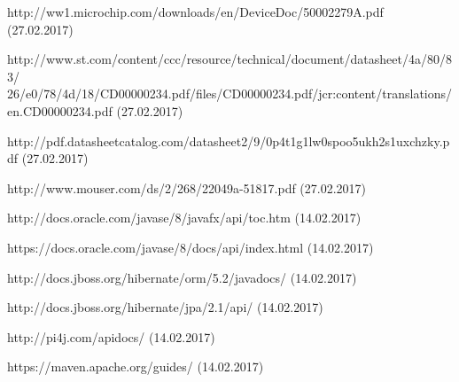 \documentclass[12pt]{article} %
\numberwithin{equation}{subsection}
\numberwithin{figure}{section}
\numberwithin{table}{section}
\begin{document}
\begin{thebibliography}{99}
		http://ww1.microchip.com/downloads/en/DeviceDoc/50002279A.pdf (27.02.2017)
		
		http://www.st.com/content/ccc/resource/technical/document/datasheet/4a/80/83/
		26/e0/78/4d/18/CD00000234.pdf/files/CD00000234.pdf/jcr:content/translations/
		en.CD00000234.pdf (27.02.2017)
		
		http://pdf.datasheetcatalog.com/datasheet2/9/0p4t1g1lw0spoo5ukh2s1uxchzky.pdf (27.02.2017)
		
		http://www.mouser.com/ds/2/268/22049a-51817.pdf (27.02.2017)
		
		http://docs.oracle.com/javase/8/javafx/api/toc.htm (14.02.2017)
		
		https://docs.oracle.com/javase/8/docs/api/index.html (14.02.2017)
		
		http://docs.jboss.org/hibernate/orm/5.2/javadocs/ (14.02.2017)
		
		http://docs.jboss.org/hibernate/jpa/2.1/api/ (14.02.2017)
		
		http://pi4j.com/apidocs/ (14.02.2017)
		
		https://maven.apache.org/guides/ (14.02.2017)
		

\end{thebibliography}
	\newpage

	\listoffigures{}
	\newpage

	\listoftables
	\newpage
\end{document}

